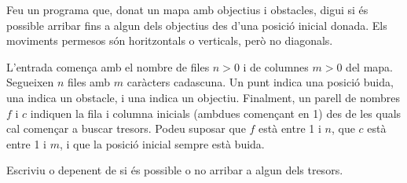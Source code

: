 

\Statement

Feu un programa que, donat un mapa amb objectius i obstacles,
digui si és possible arribar fins a algun dels objectius
des d'una posició inicial donada.
Els moviments permesos són horitzontals o verticals, però no diagonals.


\Input

L'entrada comença amb el nombre de files $n > 0$
i de columnes $m > 0$ del mapa.
Segueixen $n$ files amb $m$ caràcters cadascuna.
Un punt indica una posició buida,
una  indica un obstacle,
i una  indica un objectiu.
Finalment, un parell de nombres $f$ i $c$
indiquen la fila i columna inicials (ambdues començant en 1)
des de les quals cal començar a buscar tresors.
Podeu suposar que $f$ està entre 1 i $n$, que $c$ està entre 1 i $m$,
i que la posició inicial sempre està buida.


\Output

Escriviu  o 
depenent de si és possible o no arribar a algun dels tresors.


\Sample
